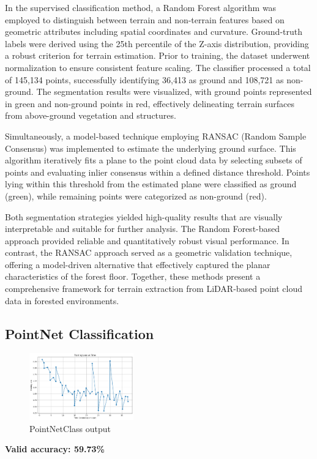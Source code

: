 \documentclass[../report.tex]{subfiles}
\begin{document}
    In the supervised classification method, a Random Forest algorithm was employed to distinguish between terrain and non-terrain features based on geometric attributes including spatial coordinates and curvature. Ground-truth labels were derived using the 25th percentile of the Z-axis distribution, providing a robust criterion for terrain estimation. Prior to training, the dataset underwent normalization to ensure consistent feature scaling. The classifier processed a total of 145,134 points, successfully identifying 36,413 as ground and 108,721 as non-ground. The segmentation results were visualized, with ground points represented in green and non-ground points in red, effectively delineating terrain surfaces from above-ground vegetation and structures.
    
    Simultaneously, a model-based technique employing RANSAC (Random Sample Consensus) was implemented to estimate the underlying ground surface. This algorithm iteratively fits a plane to the point cloud data by selecting subsets of points and evaluating inlier consensus within a defined distance threshold. Points lying within this threshold from the estimated plane were classified as ground (green), while remaining points were categorized as non-ground (red).
    
    Both segmentation strategies yielded high-quality results that are visually interpretable and suitable for further analysis. The Random Forest-based approach provided reliable and quantitatively robust visual performance. In contrast, the RANSAC approach served as a geometric validation technique, offering a model-driven alternative that effectively captured the planar characteristics of the forest floor. Together, these methods present a comprehensive framework for terrain extraction from LiDAR-based point cloud data in forested environments.
    
\subsection{PointNet Classification}
\begin{figure}[H]
    \centering
    \includegraphics[width=0.4\textwidth]{rnd-project-report-main/figures/PointNetClass.png}
    \caption{PointNetClass output}
\end{figure}
        \noindent\textbf{Valid accuracy:  59.73\%}
        
\end{document}
